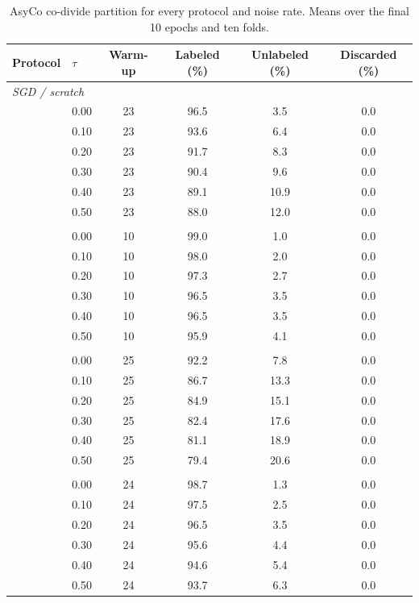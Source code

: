 \begin{table}[h!]
\centering
\begin{tabular}{llcccc}
\toprule
Protocol & $\tau$ & Warm-up & Labeled (\%) & Unlabeled (\%) & Discarded (\%) \\
\midrule
\multicolumn{6}{l}{\textit{SGD / scratch}} \\
 & 0.00 & 23 & 96.5 & 3.5 & 0.0 \\
 & 0.10 & 23 & 93.6 & 6.4 & 0.0 \\
 & 0.20 & 23 & 91.7 & 8.3 & 0.0 \\
 & 0.30 & 23 & 90.4 & 9.6 & 0.0 \\
 & 0.40 & 23 & 89.1 & 10.9 & 0.0 \\
 & 0.50 & 23 & 88.0 & 12.0 & 0.0 \\
\addlinespace
\multicolumn{6}{l}{\textit{SGD / pretrained}} \\
 & 0.00 & 10 & 99.0 & 1.0 & 0.0 \\
 & 0.10 & 10 & 98.0 & 2.0 & 0.0 \\
 & 0.20 & 10 & 97.3 & 2.7 & 0.0 \\
 & 0.30 & 10 & 96.5 & 3.5 & 0.0 \\
 & 0.40 & 10 & 96.5 & 3.5 & 0.0 \\
 & 0.50 & 10 & 95.9 & 4.1 & 0.0 \\
\addlinespace
\multicolumn{6}{l}{\textit{Adam / scratch}} \\
 & 0.00 & 25 & 92.2 & 7.8 & 0.0 \\
 & 0.10 & 25 & 86.7 & 13.3 & 0.0 \\
 & 0.20 & 25 & 84.9 & 15.1 & 0.0 \\
 & 0.30 & 25 & 82.4 & 17.6 & 0.0 \\
 & 0.40 & 25 & 81.1 & 18.9 & 0.0 \\
 & 0.50 & 25 & 79.4 & 20.6 & 0.0 \\
\addlinespace
\multicolumn{6}{l}{\textit{Adam / pretrained}} \\
 & 0.00 & 24 & 98.7 & 1.3 & 0.0 \\
 & 0.10 & 24 & 97.5 & 2.5 & 0.0 \\
 & 0.20 & 24 & 96.5 & 3.5 & 0.0 \\
 & 0.30 & 24 & 95.6 & 4.4 & 0.0 \\
 & 0.40 & 24 & 94.6 & 5.4 & 0.0 \\
 & 0.50 & 24 & 93.7 & 6.3 & 0.0 \\
\bottomrule
\end{tabular}
\caption{AsyCo co-divide partition for every protocol and noise rate. Means over the final 10 epochs and ten folds.}
\label{tab:app-mech-asyco-selection}
\end{table}
